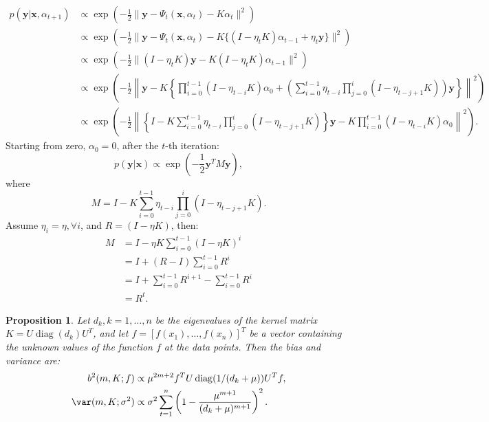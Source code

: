 \documentclass[12pt]{article}
\newtheorem{proposition}{Proposition}[section]
\DeclareMathOperator{\diag}{diag}
\begin{document}
	\begin{align}
		p(\mathbf{y}|\mathbf{x}, \alpha_{t+1}) &\propto \exp\left( -\frac{1}{2} \| \mathbf{y} - \Psi_t(\mathbf{x}, \alpha_t) - K \alpha_t \|^2 \right) \\
		&\propto \exp\left( -\frac{1}{2} \| \mathbf{y} - \Psi_t(\mathbf{x}, \alpha_t) - K \{ (I - \eta_t K) \alpha_{t-1} + \eta_t \mathbf{y} \} \|^2 \right) \\
		&\propto \exp\left( -\frac{1}{2} \| (I - \eta_t K) \mathbf{y} - K(I - \eta_t K) \alpha_{t-1} \|^2 \right) \\
		&\propto \exp\left( -\frac{1}{2} \left\| \mathbf{y} - K \left\{ \prod_{i=0}^{t-1} (I - \eta_{t-i} K) \alpha_0 + \left( \sum_{i=0}^{t-1} \eta_{t-i} \prod_{j=0}^{i} (I - \eta_{t-j+1} K) \right) \mathbf{y} \right\} \right\|^2 \right) \\
		&\propto \exp\left( -\frac{1}{2} \left\| \left\{ I - K \sum_{i=0}^{t-1} \eta_{t-i} \prod_{j=0}^{i} (I - \eta_{t-j+1} K) \right\} \mathbf{y} - K \prod_{i=0}^{t-1} (I - \eta_{t-i} K) \alpha_0 \right\|^2 \right).
	\end{align}
	Starting from zero, $\alpha_0 = 0$, after the $t$-th iteration:
	\begin{equation}
		p(\mathbf{y}|\mathbf{x}) \propto \exp\left( -\frac{1}{2} \mathbf{y}^T M \mathbf{y} \right),
	\end{equation}
	where
	\begin{equation}
		M = I - K \sum_{i=0}^{t-1} \eta_{t-i} \prod_{j=0}^{i} (I - \eta_{t-j+1} K).
	\end{equation}
	Assume $\eta_i = \eta, \forall i$, and $R = (I - \eta K)$, then:
	\begin{align}
		M &= I - \eta K \sum_{i=0}^{t-1} (I - \eta K)^i \\
		&= I + (R - I) \sum_{i=0}^{t-1} R^i \\
		&= I + \sum_{i=0}^{t-1} R^{i+1} - \sum_{i=0}^{t-1} R^i \\
		&= R^t.
	\end{align}
	
	\begin{proposition}
		Let $d_k, k = 1, \ldots, n$ be the eigenvalues of the kernel matrix $K = U \diag(d_k) U^T$, and let $f = [f(x_1), \ldots, f(x_n)]^T$ be a vector containing the unknown values of the function $f$ at the data points. Then the bias and variance are:
		\begin{align}
			b^2(m, K; f) &\propto \mu^{2m+2} f^T U \diag(1/(d_k + \mu)) U^T f, \\
			\var(m, K; \sigma^2) &\propto \sigma^2 \sum_{t=1}^{n} \left( 1 - \frac{\mu^{m+1}}{(d_k + \mu)^{m+1}} \right)^2.
		\end{align}
	\end{proposition}
	
\end{document}
